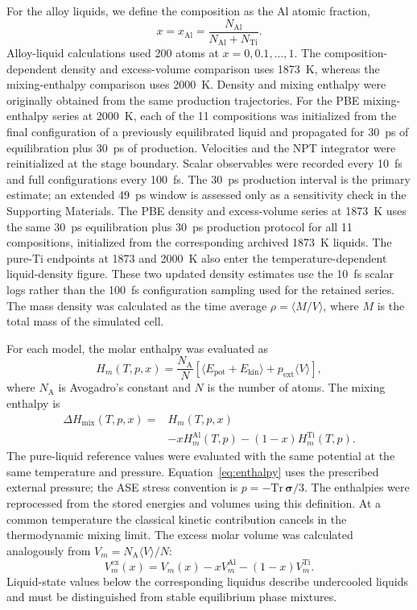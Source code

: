 For the alloy liquids, we define the composition as the Al atomic fraction,
\begin{equation}
 x = x_{\mathrm{Al}} = \frac{N_{\mathrm{Al}}}{N_{\mathrm{Al}}+N_{\mathrm{Ti}}}.
\end{equation}
Alloy-liquid calculations used 200 atoms at $x=0,0.1,\ldots,1$.
The composition-dependent density and excess-volume comparison uses 1873~K, whereas the mixing-enthalpy comparison uses 2000~K.
Density and mixing enthalpy were originally obtained from the same production trajectories.
For the PBE mixing-enthalpy series at 2000~K, each of the 11 compositions was initialized from the final configuration of a previously equilibrated liquid and propagated for 30~ps of equilibration plus 30~ps of production.
Velocities and the NPT integrator were reinitialized at the stage boundary.
Scalar observables were recorded every 10~fs and full configurations every 100~fs.
The 30~ps production interval is the primary estimate; an extended 49~ps window is assessed only as a sensitivity check in the Supporting Materials.
The PBE density and excess-volume series at 1873~K uses the same 30~ps equilibration plus 30~ps production protocol for all 11 compositions, initialized from the corresponding archived 1873~K liquids.
The pure-Ti endpoints at 1873 and 2000~K also enter the temperature-dependent liquid-density figure.
These two updated density estimates use the 10~fs scalar logs rather than the 100~fs configuration sampling used for the retained series.
The mass density was calculated as the time average $\rho=\langle M/V\rangle$, where $M$ is the total mass of the simulated cell.

For each model, the molar enthalpy was evaluated as
\begin{equation}
 H_m(T,p,x)=\frac{N_{\mathrm A}}{N}
 \left[\langle E_{\mathrm{pot}}+E_{\mathrm{kin}}\rangle+
 p_{\mathrm{ext}}\langle V\rangle\right],
 \label{eq:enthalpy}
\end{equation}
where $N_{\mathrm A}$ is Avogadro's constant and $N$ is the number of atoms.
The mixing enthalpy is
\begin{align}
 \Delta H_{\mathrm{mix}}(T,p,x)={}&H_m(T,p,x)\nonumber\\
 &-xH_m^{\mathrm{Al}}(T,p)-(1-x)H_m^{\mathrm{Ti}}(T,p).
 \label{eq:mixing}
\end{align}
The pure-liquid reference values were evaluated with the same potential at the same temperature and pressure.
Equation~\eqref{eq:enthalpy} uses the prescribed external pressure; the ASE stress convention is $p=-\mathrm{Tr}\,\boldsymbol{\sigma}/3$.
The enthalpies were reprocessed from the stored energies and volumes using this definition.
At a common temperature the classical kinetic contribution cancels in the thermodynamic mixing limit.
The excess molar volume was calculated analogously from $V_m=N_{\mathrm A}\langle V\rangle/N$:
\begin{equation}
 V_m^{\mathrm{ex}}(x)=V_m(x)-xV_m^{\mathrm{Al}}-(1-x)V_m^{\mathrm{Ti}}.
\end{equation}
Liquid-state values below the corresponding liquidus describe undercooled liquids and must be distinguished from stable equilibrium phase mixtures.

